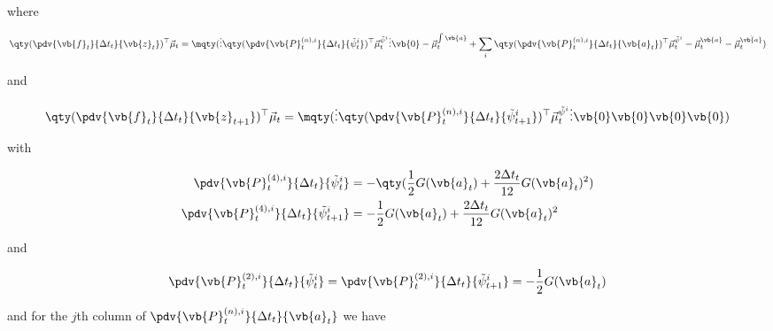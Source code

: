 \documentclass{article}
\newcommand{\isopsi}{\tilde \psi}
\begin{document}
where

\begin{equation}
  \qty(\pdv{\vb{f}_t}{\Delta t_t}{\vb{z}_t})^\top \vec \mu_t
  = \mqty(
    \vdots \\
    \qty(
      \displaystyle \pdv{\vb{P}^{(n),i}_t}{\Delta t_t}{\isopsi^i_t}
    )^\top \vec \mu^{\isopsi^i}_t \\ 
    \vdots \\
    \vb{0} \\
    -\vec \mu^{\int \vb{a}}_t 
    + \displaystyle \sum_i \qty(\pdv{\vb{P}^{(n),i}_t}{\Delta t_t}{\vb{a}_t})^\top \vec \mu^{\isopsi^i}_t \\
    -\vec \mu^{\vb{a}}_t\\ 
    -\vec \mu^{\dot{\vb{a}}}_t\\ 
  )
\end{equation}

and

\begin{equation}
  \qty(\pdv{\vb{f}_t}{\Delta t_t}{\vb{z}_{t+1}})^\top \vec \mu_t
  = \mqty(
    \vdots \\
    \qty(\displaystyle \pdv{\vb{P}^{(n),i}_t}{\Delta t_t}{\isopsi^i_{t+1}})^\top \vec \mu^{\isopsi^i}_t \\ 
    \vdots \\
    \vb{0} \\
    \vb{0} \\
    \vb{0} \\
    \vb{0} \\
  )
\end{equation}

with 

\begin{align}
  \pdv{\vb{P}^{(4),i}_t}{\Delta t_t}{\isopsi^i_t}
  &= -\qty(\frac{1}{2} G(\vb{a}_t) + \frac{2 \Delta t_t}{12} G(\vb{a}_t)^2) \\ 
  \pdv{\vb{P}^{(4),i}_t}{\Delta t_t}{\isopsi^i_{t+1}}
  &= -\frac{1}{2} G(\vb{a}_t) + \frac{2 \Delta t_t}{12} G(\vb{a}_t)^2 
\end{align}

and 

\begin{equation}
  \pdv{\vb{P}^{(2),i}_t}{\Delta t_t}{\isopsi^i_t}
  = \pdv{\vb{P}^{(2),i}_t}{\Delta t_t}{\isopsi^i_{t+1}}
  = -\frac{1}{2} G(\vb{a}_t) 
\end{equation}

and for the $j$th column of $\pdv{\vb{P}^{(n),i}_t}{\Delta t_t}{\vb{a}_t}$ we have
\end{document}

